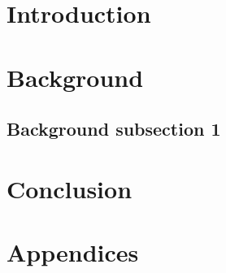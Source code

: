 

\newcommand{\courseName}{Subject Title}
\newcommand{\courseCode}{EEET 1234}
\newcommand{\dueDate}{\today}
\newcommand{\supervisors}{Professor Elemental}
\newcommand{\submissionType}{Practical Report}
\newcommand{\submissionTitle}{Practical in \LaTeX}
\newcommand{\headerTitle}{\submissionTitle}




\FloatBarrier

\section{Introduction}
\FloatBarrier

\clearpage\section{Background}
\subsection{Background subsection 1}

\clearpage\section{Conclusion}
\FloatBarrier

\clearpage
% 

\clearpage\section{Appendices}


